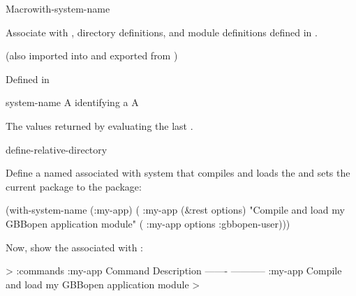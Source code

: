 \documentclass[10pt,twoside,english,pdftex]{article}
\begin{document}

\begin{functiondoc}{Macro}{with-system-name}{%
    \code{(}\code{)} \superstar{}
    \returns{} \superstar}
%
% 
%
%
%
%
%

\fnsyntax 

\fnpurpose Associate  with , directory
definitions, and module definitions defined in .

\fnpackage {}
(also imported into and exported from )

\fnmodule Defined in 

\fnargs
\begin{args}{system-name}
 A  identifying a 
\arg[form] A 
\end{args}

\fnreturns The values returned by evaluating the last .

\begin{alsos}{define-relative-directory}
\end{alsos}

\fnexamples
%
Define a  named  associated with system
 that compiles and loads the   and
sets the current package to the  package:
%
\W\supp
\begin{example}
  (with-system-name (:my-app)
    ( :my-app (&rest options)
      "Compile and load my GBBopen application module"
      ( :my-app options :gbbopen-user)))
\end{example} 

Now, show the  associated with  :
%
\W\supp
\begin{example}
  > :commands :my-app
  Command           Description
  -------           -----------
  :my-app           Compile and load my GBBopen application module
  >
\end{example}


\end{functiondoc}
\end{document}
